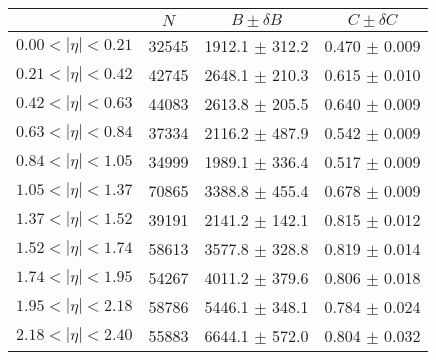 \begin{tabular}{lccc}
\hline
    &   $N$   & $B \pm \delta B$  &  $C \pm \delta C$ \\
\hline
$0.00 < |\eta| <0.21$          & 32545      & 1912.1     $\pm$ 312.2 & 0.470      $\pm$ 0.009 \\
$0.21 < |\eta| <0.42$          & 42745      & 2648.1     $\pm$ 210.3 & 0.615      $\pm$ 0.010 \\
$0.42 < |\eta| <0.63$          & 44083      & 2613.8     $\pm$ 205.5 & 0.640      $\pm$ 0.009 \\
$0.63 < |\eta| <0.84$          & 37334      & 2116.2     $\pm$ 487.9 & 0.542      $\pm$ 0.009 \\
$0.84 < |\eta| <1.05$          & 34999      & 1989.1     $\pm$ 336.4 & 0.517      $\pm$ 0.009 \\
$1.05 < |\eta| <1.37$          & 70865      & 3388.8     $\pm$ 455.4 & 0.678      $\pm$ 0.009 \\
$1.37 < |\eta| <1.52$          & 39191      & 2141.2     $\pm$ 142.1 & 0.815      $\pm$ 0.012 \\
$1.52 < |\eta| <1.74$          & 58613      & 3577.8     $\pm$ 328.8 & 0.819      $\pm$ 0.014 \\
$1.74 < |\eta| <1.95$          & 54267      & 4011.2     $\pm$ 379.6 & 0.806      $\pm$ 0.018 \\
$1.95 < |\eta| <2.18$          & 58786      & 5446.1     $\pm$ 348.1 & 0.784      $\pm$ 0.024 \\
$2.18 < |\eta| <2.40$          & 55883      & 6644.1     $\pm$ 572.0 & 0.804      $\pm$ 0.032 \\
\hline
\end{tabular}
